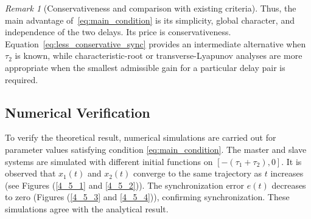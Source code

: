 \documentclass[11pt]{article}
\theoremstyle{remark}
\newtheorem{remark}[theorem]{Remark}
\begin{document}
{\begin{remark}[Conservativeness and comparison with existing criteria]
Thus, the main advantage of~\eqref{eq:main_condition} is its simplicity, global character, and independence of the two delays. Its price is conservativeness. Equation~\eqref{eq:less_conservative_sync} provides an intermediate alternative when $\tau_2$ is known, while characteristic-root or transverse-Lyapunov analyses are more appropriate when the smallest admissible gain for a particular delay pair is required.
\end{remark}
}



\subsection*{Numerical Verification}

To verify the theoretical result, numerical simulations are carried out
for parameter values satisfying condition \eqref{eq:main_condition}.
The master and slave systems are simulated with different initial
functions on $[-(\tau_1+\tau_2),0]$.
It is observed that $x_1(t)$ and $x_2(t)$ converge to the same trajectory
as $t$ increases (see Figures (\ref{4_5_1} and \ref{4_5_2})). 
The synchronization error $e(t)$ decreases to zero (Figures (\ref{4_5_3} and \ref{4_5_4})), confirming synchronization.
These simulations agree with the analytical result.
\end{document}
